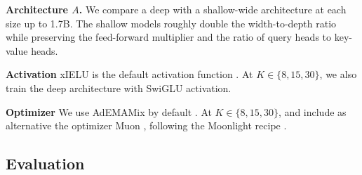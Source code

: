 \textbf{Architecture $A$.} We compare a deep with a shallow-wide architecture at each size up to 1.7B. The shallow models roughly double the width-to-depth ratio while preserving the feed-forward multiplier and the ratio of query heads to key-value heads. %

\textbf{Activation}
xIELU is the default activation function \citep{huang_xielu_2025}.
At $K \in \{8, 15, 30\}$, we also train the deep architecture with SwiGLU activation. %

\textbf{Optimizer}
We use AdEMAMix by default \citeneeded.
At $K \in \{8, 15, 30\}$, and include as alternative the optimizer Muon \citep{jordan_muon_2024}, following the Moonlight recipe \citep{liu_muon_2025}. %



\subsection{Evaluation}
\label{subsec:evaluation}


